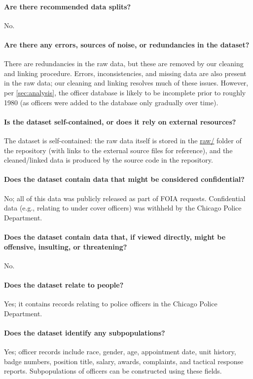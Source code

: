 \paragraph{Are there recommended data splits?}
No.

\paragraph{Are there any errors, sources of noise, or redundancies in the dataset?}
There are redundancies in the raw data, but these are removed by our cleaning and linking procedure.
Errors, inconsistencies, and missing data are also present in the raw data; our cleaning and linking
resolves much of these issues. However, per \cref{sec:analysis}, the officer database is
likely to be incomplete prior to roughly 1980 (as officers were added to the database only gradually over time).

\paragraph{Is the dataset self-contained, or does it rely on external resources?}
The dataset is self-contained: the raw data itself is stored in the \url{raw/} folder of the repository 
(with links to the external source files for reference), 
and the cleaned/linked data is produced by the source code in the repository.

\paragraph{Does the dataset contain data that might be considered confidential?}
No; all of this data was publicly released as part of FOIA requests. 
Confidential data (e.g., relating to under cover officers) was withheld 
by the Chicago Police Department.

\paragraph{Does the dataset contain data that, if viewed directly, might be offensive, insulting, or threatening?}
No.

\paragraph{Does the dataset relate to people?} 
Yes; it contains records relating to police officers in the Chicago Police Department.

\paragraph{Does the dataset identify any subpopulations?}
Yes; officer records include race, gender, age, appointment date, unit history, badge numbers, position title,
salary, awards, complaints, and tactical response reports. Subpopulations of officers can be constructed
using these fields.

